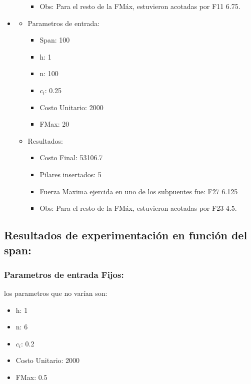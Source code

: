 \begin{itemize}
\begin{itemize}
\begin{itemize}
	    \item Obs: Para el resto de la FM\'ax, estuvieron acotadas por F11 6.75.
	  \end{itemize}
      \end{itemize}
\item
  \begin{itemize}
    \item Parametros de entrada:
	  \begin{itemize}
	    \item Span: 100
	    \item h: 1
	    \item n: 100
	    \item $c_i$: 0.25
	    \item Costo Unitario: 2000
	    \item FMax: 20
	  \end{itemize}
      \item Resultados:
	  \begin{itemize}
	    \item Costo Final: 53106.7
	    \item Pilares insertados: 5
	    \item Fuerza Maxima ejercida en uno de los subpuentes fue: F27 6.125
	    \item Obs: Para el resto de la FM\'ax, estuvieron acotadas por F23 4.5.
	  \end{itemize}
      \end{itemize}
\end{itemize}

\subsection{Resultados de experimentaci\'on en funci\'on del span:}
\subsubsection{Parametros de entrada Fijos:}
los parametros que no var\'ian son:
  \begin{itemize}
      \item h: 1
      \item n: 6
      \item $c_i$: 0.2
      \item Costo Unitario: 2000
      \item FMax: 0.5
  \end{itemize}

